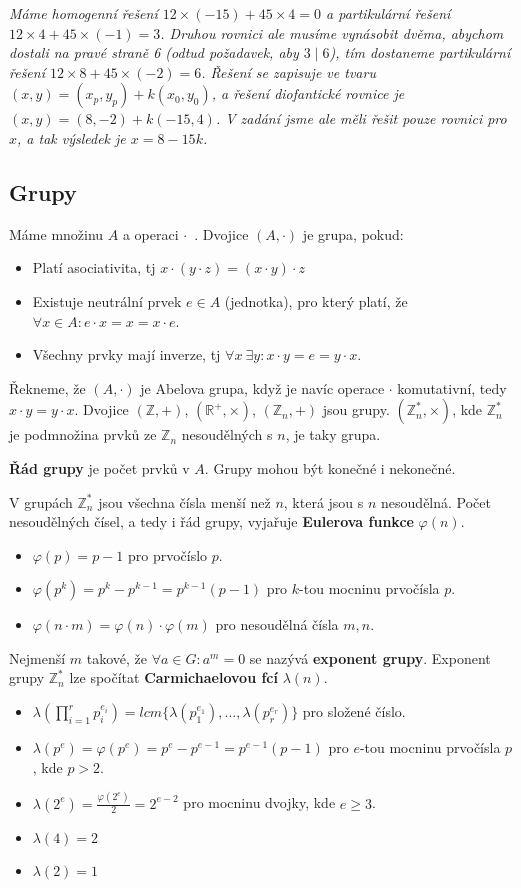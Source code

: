 \documentclass[10pt,a4paper]{article}
\begin{document}
\textit{Máme homogenní řešení $12\times(-15) + 45\times 4 = 0$ a partikulární řešení $12\times4 + 45\times(-1) = 3$. Druhou rovnici ale musíme vynásobit dvěma, abychom dostali na pravé straně 6 (odtud požadavek, aby $3\mid6$), tím dostaneme partikulární řešení $12\times8 + 45\times(-2) = 6$. Řešení se zapisuje ve tvaru $(x,y) = (x_p,y_p) + k(x_0,y_0)$, a řešení diofantické rovnice je $(x,y) = (8, -2) + k(-15,4)$. V zadání jsme ale měli řešit pouze rovnici pro $x$, a tak výsledek je $x = 8 - 15k$.}

\subsection{Grupy}
Máme množinu $A$ a operaci $\cdot$~. Dvojice $(A,\cdot)$ je grupa, pokud:
\begin{itemize}
\item Platí asociativita, tj $x\cdot(y\cdot z) = (x\cdot y)\cdot z$
\item Existuje neutrální prvek $e \in A$ (jednotka), pro který platí, že $\forall x \in A: e\cdot x = x = x \cdot e$.
\item Všechny prvky mají inverze, tj $\forall x ~\exists y: x\cdot y = e = y \cdot x$.
\end{itemize}
Řekneme, že $(A,\cdot)$ je Abelova grupa, když je navíc operace $\cdot$ komutativní, tedy $x\cdot y = y \cdot x$.
Dvojice $(\mathbb{Z}, +)$,  $(\mathbb{R}^+, \times)$,  $(\mathbb{Z}_n, +)$ jsou grupy. $(\mathbb{Z}_n^*, \times)$, kde $\mathbb{Z}_n^*$ je podmnožina prvků ze $\mathbb{Z}_n$ nesoudělných s $n$, je taky grupa.

\textbf{Řád grupy} je počet prvků v $A$. Grupy mohou být konečné i nekonečné.

V grupách $\mathbb{Z}_n^*$ jsou všechna čísla menší než $n$, která jsou s $n$ nesoudělná. Počet nesoudělných čísel, a tedy i řád grupy, vyjařuje \textbf{Eulerova funkce} $\varphi(n)$.
\begin{itemize}
\item $\varphi(p) = p-1$ pro prvočíslo $p$.
\item $\varphi(p^k) = p^k - p^{k-1} = p^{k-1}(p-1)$ pro $k$-tou mocninu prvočísla $p$.
\item $\varphi(n\cdot m) = \varphi(n)\cdot\varphi(m)$ pro nesoudělná čísla $m,n$.
\end{itemize}

Nejmenší $m$ takové, že $\forall a \in G: a^m = 0$ se nazývá \textbf{exponent grupy}. Exponent grupy $\mathbb{Z}_n^*$ lze spočítat \textbf{Carmichaelovou fcí} $\lambda(n)$.
\begin{itemize}
\item $\lambda(\prod_{i=1}^r p_i^{e_i}) = lcm\{\lambda(p_1^{e_1}), \ldots, \lambda(p_r^{e_r})\}$ pro složené číslo.
\item $\lambda(p^e) = \varphi(p^e) = p^e - p^{e-1} = p^{e-1}(p-1)$ pro $e$-tou mocninu prvočísla $p$, kde $p > 2$.
\item $\lambda(2^e) = \frac{\varphi(2^e)}{2} = 2^{e - 2}$ pro mocninu dvojky, kde $e \geq 3$.
\item $\lambda(4) = 2$
\item $\lambda(2) = 1$
\end{itemize}
\end{document}
